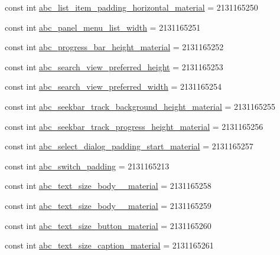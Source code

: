 \begin{CompactItemize}
\item 
const int \hyperlink{class__2doo_1_1_droid_1_1_resource_1_1_dimension_752b5083c868f2209db96f6ffe3446ca}{abc\_\-list\_\-item\_\-padding\_\-horizontal\_\-material} = 2131165250
\item 
const int \hyperlink{class__2doo_1_1_droid_1_1_resource_1_1_dimension_ae88f0426f259e7f0076992a7f659fa3}{abc\_\-panel\_\-menu\_\-list\_\-width} = 2131165251
\item 
const int \hyperlink{class__2doo_1_1_droid_1_1_resource_1_1_dimension_0bc1e6ceab923eebf728eca88c681b10}{abc\_\-progress\_\-bar\_\-height\_\-material} = 2131165252
\item 
const int \hyperlink{class__2doo_1_1_droid_1_1_resource_1_1_dimension_d9f6d955bde7e10db2a2cb5a8e5df7ee}{abc\_\-search\_\-view\_\-preferred\_\-height} = 2131165253
\item 
const int \hyperlink{class__2doo_1_1_droid_1_1_resource_1_1_dimension_18d619e9908e4cde017a9f8f6d4ce85f}{abc\_\-search\_\-view\_\-preferred\_\-width} = 2131165254
\item 
const int \hyperlink{class__2doo_1_1_droid_1_1_resource_1_1_dimension_e03e6b30cc65bce11533d6ad67d4a09c}{abc\_\-seekbar\_\-track\_\-background\_\-height\_\-material} = 2131165255
\item 
const int \hyperlink{class__2doo_1_1_droid_1_1_resource_1_1_dimension_f15a85f0c7fcdca67261ba380d93bf11}{abc\_\-seekbar\_\-track\_\-progress\_\-height\_\-material} = 2131165256
\item 
const int \hyperlink{class__2doo_1_1_droid_1_1_resource_1_1_dimension_ca5fe05e2a845e0d2beff6d90d3c71ba}{abc\_\-select\_\-dialog\_\-padding\_\-start\_\-material} = 2131165257
\item 
const int \hyperlink{class__2doo_1_1_droid_1_1_resource_1_1_dimension_522052c4f280c298bc7c572d4886bbb4}{abc\_\-switch\_\-padding} = 2131165213
\item 
const int \hyperlink{class__2doo_1_1_droid_1_1_resource_1_1_dimension_c51d67cd4d101f7b6e4def7ce2ff5e97}{abc\_\-text\_\-size\_\-body\_\_\-material} = 2131165258
\item 
const int \hyperlink{class__2doo_1_1_droid_1_1_resource_1_1_dimension_274258f9947975eb3498fe20636a3508}{abc\_\-text\_\-size\_\-body\_\_\-material} = 2131165259
\item 
const int \hyperlink{class__2doo_1_1_droid_1_1_resource_1_1_dimension_44c0d2af8ef603e8f7802518c1191b10}{abc\_\-text\_\-size\_\-button\_\-material} = 2131165260
\item 
const int \hyperlink{class__2doo_1_1_droid_1_1_resource_1_1_dimension_3537e2f744e52be884edf5726c0d486d}{abc\_\-text\_\-size\_\-caption\_\-material} = 2131165261

\end{CompactItemize}
